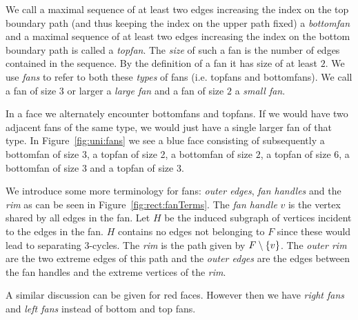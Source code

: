     We call a maximal sequence of at least two edges increasing the index on the top boundary path (and thus keeping the index on the upper path fixed) a \emph{bottomfan} and a maximal sequence of at least two edges increasing the index on the bottom boundary path is called a \emph{topfan}.
    The \emph{size} of such a fan is the number of edges contained in the sequence. By the definition of a fan it has size of at least $2$.
    We use \emph{fans} to refer to both these \emph{types} of fans (i.e. topfans and bottomfans).
    We call a fan of size $3$ or larger a \emph{large fan} and a fan of size $2$ a \emph{small fan}.

    In a face we alternately encounter bottomfans and topfans. If we would have two adjacent fans of the same type, we would just have a single larger fan of that type.
    In Figure~\ref{fig:uni:fans} we see a blue face consisting of subsequently a bottomfan of size $3$, a topfan of size 2, a bottomfan of size $2$, a topfan of size $6$, a bottomfan of size $3$ and a topfan of size $3$.

   We introduce some more terminology for fans: \emph{outer edges}, \emph{fan handles} and the \emph{rim} as can be seen in Figure~\ref{fig:rect:fanTerms}. The \emph{fan handle} $v$ is the vertex shared by all edges in the fan. Let $H$ be the induced subgraph of vertices incident to the edges in the fan. $H$ contains no edges not belonging to $F$ since these would lead to separating 3-cycles. The \emph{rim} is the path given by $F\setminus \left\lbrace {v} \right\rbrace$.
   The \emph{outer rim} are the two extreme edges of this path and the \emph{outer edges} are the edges between the fan handles and the extreme vertices of the \emph{rim}.

   A similar discussion can be given for red faces. However then we have \emph{right fans} and \emph{left fans} instead of bottom and top fans.

\newpage{}

